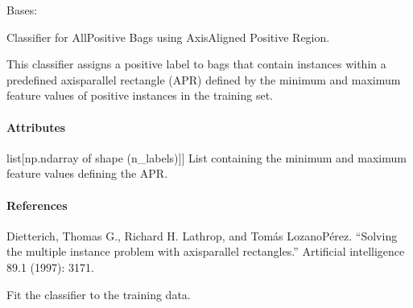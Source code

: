 \documentclass[letterpaper,10pt,english]{sphinxmanual}
\begin{document}
\begin{fulllineitems}
\label{\detokenize{classifier/mi/_autosummary/miml.classifier.mi.apr_classifier.APRClassifier:miml.classifier.mi.apr_classifier.APRClassifier}}
\pysigstartsignatures
{}
\pysigstopsignatures
\sphinxAtStartPar
Bases: 

\sphinxAtStartPar
Classifier for All\sphinxhyphen{}Positive Bags using Axis\sphinxhyphen{}Aligned Positive Region.

\sphinxAtStartPar
This classifier assigns a positive label to bags that contain instances within a predefined
axis\sphinxhyphen{}parallel rectangle (APR) defined by the minimum and maximum feature values of positive
instances in the training set.


\paragraph{Attributes}
\label{\detokenize{classifier/mi/_autosummary/miml.classifier.mi.apr_classifier.APRClassifier:attributes}}\begin{description}
\sphinxlineitem{apr}{[}list{[}np.ndarray of shape (n\_labels){]}{]}
\sphinxAtStartPar
List containing the minimum and maximum feature values defining the APR.

\end{description}


\paragraph{References}
\label{\detokenize{classifier/mi/_autosummary/miml.classifier.mi.apr_classifier.APRClassifier:references}}
\sphinxAtStartPar
Dietterich, Thomas G., Richard H. Lathrop, and Tomás Lozano\sphinxhyphen{}Pérez.
“Solving the multiple instance problem with axis\sphinxhyphen{}parallel rectangles.”
Artificial intelligence 89.1 (1997): 31\sphinxhyphen{}71.

\begin{fulllineitems}
\label{\detokenize{classifier/mi/_autosummary/miml.classifier.mi.apr_classifier.APRClassifier:miml.classifier.mi.apr_classifier.APRClassifier.fit}}
\pysigstartsignatures
{}
\pysigstopsignatures
\sphinxAtStartPar
Fit the classifier to the training data.



\end{fulllineitems}
\end{fulllineitems}
\end{document}
